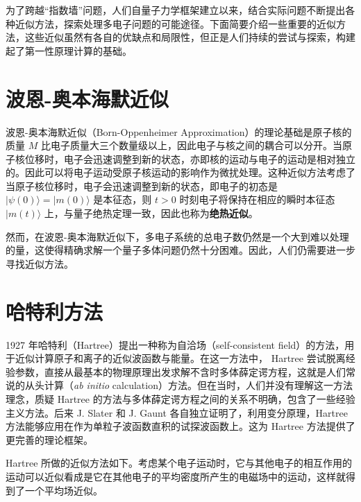 为了跨越“指数墙”问题，人们自量子力学框架建立以来，结合实际问题不断提出各种近似方法，探索处理多电子问题的可能途径。下面简要介绍一些重要的近似方法，这些近似虽然有各自的优缺点和局限性，但正是人们持续的尝试与探索，构建起了第一性原理计算的基础。
\section{波恩-奥本海默近似}
波恩-奥本海默近似（Born-Oppenheimer Approximation）的理论基础是原子核的质量 $M$ 比电子质量大三个数量级以上，因此电子与核之间的耦合可以分开\cite{born1927quantum}。当原子核位移时，电子会迅速调整到新的状态，亦即核的运动与电子的运动是相对独立的。因此可以将电子运动受原子核运动的影响作为微扰处理。这种近似方法考虑了当原子核位移时，电子会迅速调整到新的状态，即电子的初态是 $|\psi(0)\rangle=|m(0)\rangle$ 是本征态，则 $t>0$ 时刻电子将保持在相应的瞬时本征态 $|m(t)\rangle$ 上，与量子绝热定理一致，因此也称为\textbf{绝热近似}\cite{Born1928BeweisDA}。

然而，在波恩-奥本海默近似下，多电子系统的总电子数仍然是一个大到难以处理的量，这使得精确求解一个量子多体问题仍然十分困难。因此，人们仍需要进一步寻找近似方法。

\section{哈特利方法}
1927 年哈特利（Hartree）提出一种称为自洽场（self-consistent field）的方法，用于近似计算原子和离子的近似波函数与能量\cite{hartree_1928}。在这一方法中， Hartree 尝试脱离经验参数，直接从最基本的物理原理出发求解不含时多体薛定谔方程，这就是人们常说的从头计算（\textit{ab initio} calculation）方法。但在当时，人们并没有理解这一方法理念，质疑 Hartree 的方法与多体薛定谔方程之间的关系不明确，包含了一些经验主义方法。后来 J. Slater 和 J. Gaunt 各自独立证明了，利用变分原理，Hartree 方法能够应用在作为单粒子波函数直积的试探波函数上\cite{PhysRev.32.339, gaunt_1928}。这为 Hartree 方法提供了更完善的理论框架。

Hartree 所做的近似方法如下。考虑某个电子运动时，它与其他电子的相互作用的运动可以近似看成是它在其他电子的平均密度所产生的电磁场中的运动，这样就得到了一个平均场近似。

